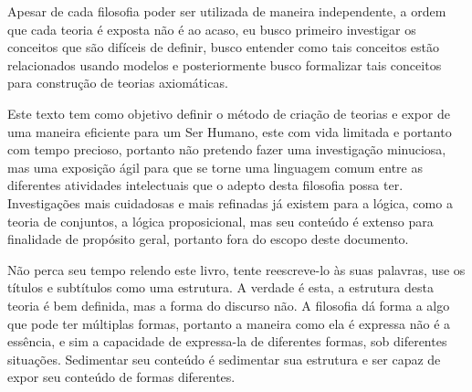 \documentclass[10pt,a4paper]{report}
\begin{document}
Apesar de cada filosofia poder ser utilizada de maneira independente, a ordem que cada teoria é exposta não é ao acaso, eu busco primeiro investigar os conceitos que são difíceis de definir, busco entender como tais conceitos estão relacionados usando modelos e posteriormente busco formalizar tais conceitos para construção de teorias axiomáticas.

\hspace{\baselineskip}

Este texto tem como objetivo definir o método de criação de teorias e expor de uma maneira eficiente para um Ser Humano, este com vida limitada e portanto com tempo precioso, portanto não pretendo fazer uma investigação minuciosa, mas uma exposição ágil para que se torne uma linguagem comum entre as diferentes atividades intelectuais que o adepto desta filosofia possa ter. Investigações mais cuidadosas e mais refinadas já existem para a lógica, como a teoria de conjuntos, a lógica proposicional, mas seu conteúdo é extenso para finalidade de propósito geral, portanto fora do escopo deste documento.

% 
\hspace{\baselineskip}

Não perca seu tempo relendo este livro, tente reescreve-lo às suas palavras, use os títulos e subtítulos como uma estrutura. A verdade é esta, a estrutura desta teoria é bem definida, mas a forma do discurso não. A filosofia dá forma a algo que pode ter múltiplas formas, portanto a maneira como ela é expressa não é a essência, e sim a capacidade de expressa-la de diferentes formas, sob diferentes situações. Sedimentar seu conteúdo é sedimentar sua estrutura e ser capaz de expor seu conteúdo de formas diferentes.

\end{document}
